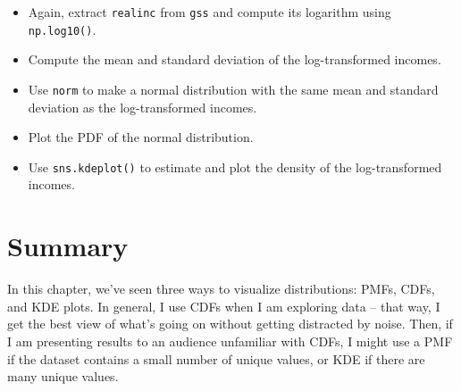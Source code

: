 \documentclass[
]{book}
\newcommand{\passthrough}[1]{#1}
\begin{document}
\begin{itemize}
\item
  Again, extract \passthrough{\lstinline!realinc!} from
  \passthrough{\lstinline!gss!} and compute its logarithm using
  \passthrough{\lstinline!np.log10()!}.
\item
  Compute the mean and standard deviation of the log-transformed
  incomes.
\item
  Use \passthrough{\lstinline!norm!} to make a normal distribution with
  the same mean and standard deviation as the log-transformed incomes.
\item
  Plot the PDF of the normal distribution.
\item
  Use \passthrough{\lstinline!sns.kdeplot()!} to estimate and plot the
  density of the log-transformed incomes.
\end{itemize}

\section{Summary}\label{summary}

In this chapter, we've seen three ways to visualize distributions: PMFs,
CDFs, and KDE plots. In general, I use CDFs when I am exploring data --
that way, I get the best view of what's going on without getting
distracted by noise. Then, if I am presenting results to an audience
unfamiliar with CDFs, I might use a PMF if the dataset contains a small
number of unique values, or KDE if there are many unique values.

\backmatter
\end{document}
